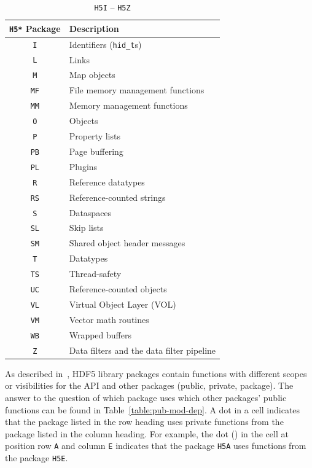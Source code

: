 \begin{table}[h]
\begin{tabular}{||c|l||}
\hline
\textbf{\texttt{H5*} Package} & \textbf{Description} \\  [0.5ex] 
\hline\hline
\texttt{I} & Identifiers (\texttt{hid\_t}s) \\
\texttt{L} & Links \\
\texttt{M} & Map objects \\
\texttt{MF} & File memory management functions \\
\texttt{MM} & Memory management functions \\
\texttt{O} & Objects \\
\texttt{P} & Property lists \\
\texttt{PB} & Page buffering \\
\texttt{PL} & Plugins \\
\texttt{R} & Reference datatypes \\
\texttt{RS} & Reference-counted strings \\
\texttt{S} & Dataspaces \\
\texttt{SL} & Skip lists \\
\texttt{SM} & Shared object header messages \\
\texttt{T} & Datatypes \\
\texttt{TS} & Thread-safety \\
\texttt{UC} & Reference-counted objects \\
\texttt{VL} & Virtual Object Layer (VOL) \\
\texttt{VM} & Vector math routines \\
\texttt{WB} & Wrapped buffers \\
\texttt{Z} & Data filters and the data filter pipeline \\
\hline
\end{tabular}
\caption{\texttt{H5I} -- \texttt{H5Z}}
\label{table:H5prefixesIZ}
\end{table}

As described in~\cite{libhdf5-dev-101}, HDF5 library packages contain functions with different scopes or visibilities for the API and other packages (public, private, package).
The answer to the question of which package uses which other packages' public functions can be found in Table~\ref{table:pub-mod-dep}. A dot in a cell indicates that the package listed in the row heading uses private functions from the package listed in the column heading. For example, the dot (\textbullet) in the cell at position row \texttt{A} and column \texttt{E} indicates that the package \texttt{H5A} uses functions from the package \texttt{H5E}.

